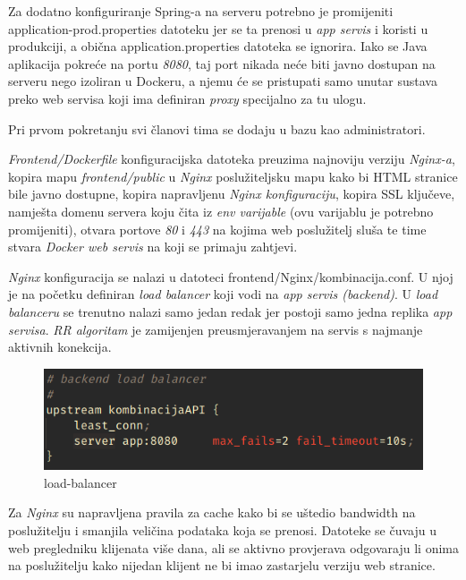 		Za dodatno konfiguriranje Spring-a na serveru potrebno je promijeniti application-prod.properties datoteku jer se ta prenosi u  \textit{app servis} i koristi u produkciji, a obična application.properties datoteka se ignorira. 
Iako se Java aplikacija pokreće na portu  \textit{8080}, taj port nikada neće biti javno dostupan na serveru nego izoliran u Dockeru, a njemu će se pristupati samo unutar sustava preko web servisa koji ima definiran  \textit{proxy} specijalno za tu ulogu.

		Pri prvom pokretanju svi članovi tima se dodaju u bazu kao administratori.\\
		
		
		
		 \textit{Frontend/Dockerfile}  konfiguracijska datoteka preuzima najnoviju verziju  \textit{Nginx-a}, kopira mapu  \textit{frontend/public} u  \textit{Nginx} poslužiteljsku mapu kako bi HTML stranice bile javno dostupne, kopira napravljenu  \textit{Nginx konfiguraciju}, kopira SSL ključeve, namješta domenu servera koju čita iz  \textit{env varijable} (ovu varijablu je potrebno promijeniti), otvara portove  \textit{80} i  \textit{443} na kojima web poslužitelj sluša te time stvara  \textit{Docker web servis} na koji se primaju zahtjevi.

		 \textit{Nginx} konfiguracija se nalazi u datoteci frontend/Nginx/kombinacija.conf. U njoj je na početku definiran  \textit{load balancer} koji vodi na  \textit{app servis (backend)}. U  \textit{load balanceru} se trenutno nalazi samo jedan redak jer postoji samo jedna replika  \textit{app servisa}.  \textit{RR algoritam} je zamijenjen preusmjeravanjem na servis s najmanje aktivnih konekcija.
		
		\begin{figure}[H]
					\includegraphics[scale=0.8]{figures/6-load-balancer.PNG}
					\centering
					\caption{load-balancer}
					\label{fig:load-balancer}
				\end{figure} 
		
		Za  \textit{Nginx} su napravljena pravila za cache kako bi se uštedio bandwidth na poslužitelju i smanjila veličina podataka koja se prenosi. Datoteke se čuvaju u web pregledniku klijenata više dana, ali se aktivno provjerava odgovaraju li onima na poslužitelju kako nijedan klijent ne bi imao zastarjelu verziju web stranice.
		
